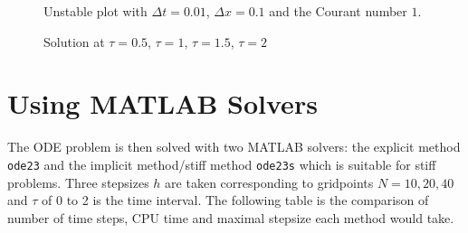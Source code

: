 \documentclass{article}
\begin{document}
\begin{figure}
  \centering
  \caption{Unstable plot with $\Delta t = 0.01$, $\Delta x = 0.1$ and the
    Courant number $1$.}
    \label{unstable_solution}
\end{figure}

\begin{figure}
  \centering
  \caption{Solution at $\tau = 0.5$, $\tau = 1$, $\tau = 1.5$, $\tau = 2$}
    \label{2dplots}
\end{figure}

\section{Using MATLAB Solvers}

The ODE problem is then solved with two MATLAB solvers: the explicit method
\texttt{ode23} and the implicit method/stiff method \texttt{ode23s} which is
suitable for stiff problems. Three stepsizes $h$ are taken corresponding to
gridpoints $N = 10, 20, 40$ and $\tau$ of 0 to 2 is the time interval. The
following table is the comparison of number of time steps, CPU time and
maximal stepsize each method would take.
\end{document}
